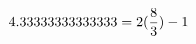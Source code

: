 \documentclass[preview]{standalone}
\begin{document}
\begin{align*}
\special{dvisvgm:raw <g id='unique000'>}4.33333333333333 = 2(\frac{8}{3}) - 1\special{dvisvgm:raw </g>}
\end{align*}
\end{document}
